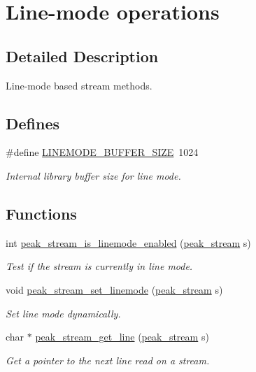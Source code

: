 \hypertarget{group__stream__line}{
\section{Line-mode operations}
\label{group__stream__line}
}


\subsection{Detailed Description}
Line-mode based stream methods. 



\subsection*{Defines}
\begin{CompactItemize}
\item 
\#define \hyperlink{group__stream__line_ga3}{LINEMODE\_\-BUFFER\_\-SIZE}\ 1024
\begin{CompactList}\small\item\em Internal library buffer size for line mode. \item\end{CompactList}\end{CompactItemize}
\subsection*{Functions}
\begin{CompactItemize}
\item 
int \hyperlink{group__stream__line_ga0}{peak\_\-stream\_\-is\_\-linemode\_\-enabled} (\hyperlink{group__stream_ga0}{peak\_\-stream} s)
\begin{CompactList}\small\item\em Test if the stream is currently in line mode. \item\end{CompactList}\item 
void \hyperlink{group__stream__line_ga1}{peak\_\-stream\_\-set\_\-linemode} (\hyperlink{group__stream_ga0}{peak\_\-stream} s)
\begin{CompactList}\small\item\em Set line mode dynamically. \item\end{CompactList}\item 
char $\ast$ \hyperlink{group__stream__line_ga2}{peak\_\-stream\_\-get\_\-line} (\hyperlink{group__stream_ga0}{peak\_\-stream} s)
\begin{CompactList}\small\item\em Get a pointer to the next line read on a stream. \item\end{CompactList}\end{CompactItemize}


